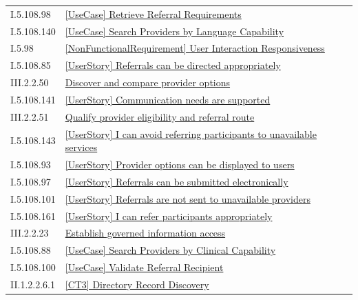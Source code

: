 \begin{longtable}{p{.22\linewidth}p{.73\linewidth}}
I.5.108.98 & \hyperref[element:03981ef5f8da443c8d84f8c01c634739]{[UseCase] Retrieve Referral Requirements} \\
I.5.108.140 & \hyperref[element:0456a69a7dd646509911491237ce0085]{[UseCase] Search Providers by Language Capability} \\
I.5.98 & \hyperref[element:0f07f89a3a854bfdac4d4fc423feefca]{[NonFunctionalRequirement] User Interaction Responsiveness} \\
I.5.108.85 & \hyperref[element:126248e2ec5b466195c8a68c00c5c94f]{[UserStory] Referrals can be directed appropriately} \\
III.2.2.50 & \hyperref[element:13370b1e9a1349d8ba074e3ad5a8c1ae]{Discover and compare provider options} \\
I.5.108.141 & \hyperref[element:13393d9821e54346813154eacf4817cd]{[UserStory] Communication needs are supported} \\
III.2.2.51 & \hyperref[element:1406d16dbefa4752af95ca6041cd5712]{Qualify provider eligibility and referral route} \\
I.5.108.143 & \hyperref[element:176d580d1387416f8f04d99d832a3c90]{[UserStory] I can avoid referring participants to unavailable services} \\
I.5.108.93 & \hyperref[element:1843799ce35747cc8ac98945d3a167ae]{[UserStory] Provider options can be displayed to users} \\
I.5.108.97 & \hyperref[element:1a8217ba0300427dac8c5d5bb97a1430]{[UserStory] Referrals can be submitted electronically} \\
I.5.108.101 & \hyperref[element:1cf763b0d860490d9bb4520a800bed12]{[UserStory] Referrals are not sent to unavailable providers} \\
I.5.108.161 & \hyperref[element:246232201bd84ba7af0a5c1570a3433b]{[UserStory] I can refer participants appropriately} \\
III.2.2.23 & \hyperref[element:26719186d6444b5b80029fbf13ae7d06]{Establish governed information access} \\
I.5.108.88 & \hyperref[element:26e09a3374b64d74b6d830506f55a7bf]{[UseCase] Search Providers by Clinical Capability} \\
I.5.108.100 & \hyperref[element:2706b4f787c248469bb35dff44dc3707]{[UseCase] Validate Referral Recipient} \\
II.1.2.2.6.1 & \hyperref[element:2bebb37d407a4816aed79e9a13e324e9]{[CT3] Directory Record Discovery} \\

\end{longtable}
